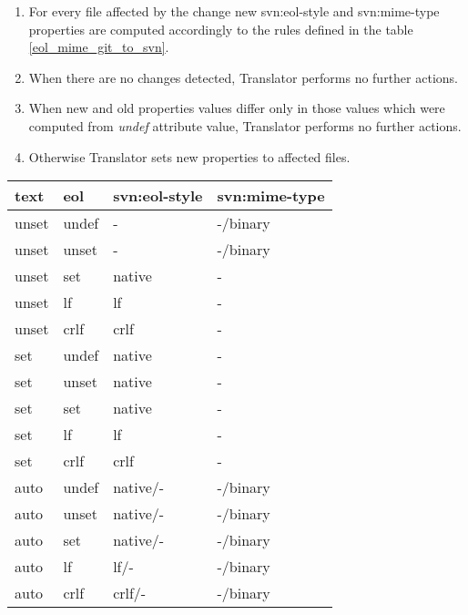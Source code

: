 \begin{enumerate}
\compactlist
\item For every file affected by the change new svn:eol-style and svn:mime-type properties are computed accordingly to the rules defined in the table \ref{eol_mime_git_to_svn}.
\item When there are no changes detected, Translator performs no further actions.
\item When new and old properties values differ only in those values which were computed from \emph{undef} attribute value, Translator performs no further actions.
\item Otherwise Translator sets new properties to affected files.
\end{enumerate}

\begin{center}
\begin{tabular}{ | p{} | p{} | p{} | p{} |}
	\hline
	text  & eol      &  svn:eol-style  &  svn:mime-type \\ \hline \hline
	unset & undef    &  -              &  -/binary \footnotemark[1] \\ \hline
	unset & unset    &  -              &  -/binary \footnotemark[2] \\ \hline
	unset & set      &  native         &  - \footnotemark[3] \\ \hline
	unset & lf       &  lf             &  - \\ \hline
	unset & crlf     &  crlf           &  - \\ \hline
	set   & undef    &  native         &  - \\ \hline
	set   & unset    &  native         &  - \footnotemark[4] \\ \hline
	set   & set      &  native         &  - \\ \hline
	set   & lf       &  lf             &  - \\ \hline
	set   & crlf     &  crlf           &  - \\ \hline
	auto  & undef    &  native/-       &  -/binary \footnotemark[1] \\ \hline
	auto  & unset    &  native/-       &  -/binary \footnotemark[5] \\ \hline
	auto  & set      &  native/-       &  -/binary \\ \hline
	auto  & lf       &  lf/-           &  -/binary \\ \hline
	auto  & crlf     &  crlf/-         &  -/binary \\ \hline

\end{tabular}
\end{center}
